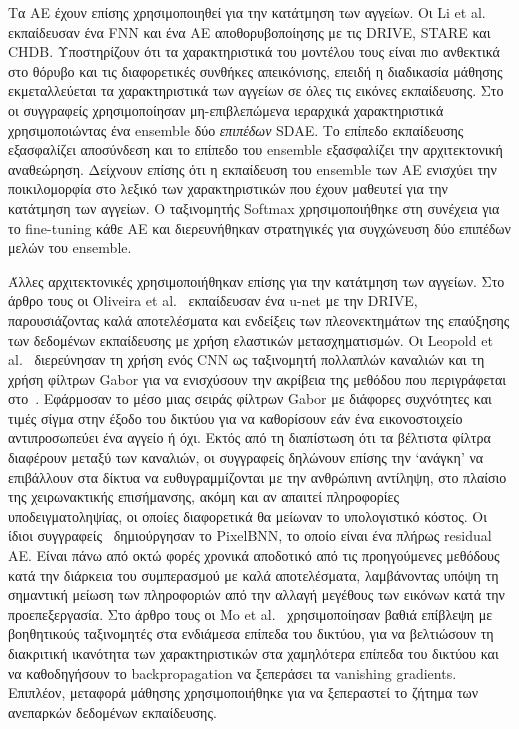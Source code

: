 Τα ΑΕ έχουν επίσης χρησιμοποιηθεί για την κατάτμηση των αγγείων.
Οι Li et al.~\cite{li2016cross} εκπαίδευσαν ένα FNN και ένα AE αποθορυβοποίησης με τις DRIVE, STARE και CHDB\@.
Υποστηρίζουν ότι τα χαρακτηριστικά του μοντέλου τους είναι πιο ανθεκτικά στο θόρυβο και τις διαφορετικές συνθήκες απεικόνισης, επειδή η διαδικασία μάθησης εκμεταλλεύεται τα χαρακτηριστικά των αγγείων σε όλες τις εικόνες εκπαίδευσης.
Στο~\cite{lahiri2016deep} οι συγγραφείς χρησιμοποίησαν μη-επιβλεπώμενα ιεραρχικά χαρακτηριστικά χρησιμοποιώντας ένα ensemble δύο \textit{επιπέδων} SDAE\@.
Το επίπεδο εκπαίδευσης εξασφαλίζει αποσύνδεση και το επίπεδο του ensemble εξασφαλίζει την αρχιτεκτονική αναθεώρηση.
Δείχνουν επίσης ότι η εκπαίδευση του ensemble των ΑΕ ενισχύει την ποικιλομορφία στο λεξικό των χαρακτηριστικών που έχουν μαθευτεί για την κατάτμηση των αγγείων.
Ο ταξινομητής Softmax χρησιμοποιήθηκε στη συνέχεια για το fine-tuning κάθε ΑΕ και διερευνήθηκαν στρατηγικές για συγχώνευση δύο επιπέδων μελών του ensemble.

Άλλες αρχιτεκτονικές χρησιμοποιήθηκαν επίσης για την κατάτμηση των αγγείων.
Στο άρθρο τους οι Oliveira et al.~\cite{oliveira2017augmenting} εκπαίδευσαν ένα u-net με την DRIVE, παρουσιάζοντας καλά αποτελέσματα και ενδείξεις των πλεονεκτημάτων της επαύξησης των δεδομένων εκπαίδευσης με χρήση ελαστικών μετασχηματισμών.
Οι Leopold et al.~\cite{leopold2017use} διερεύνησαν τη χρήση ενός CNN ως ταξινομητή πολλαπλών καναλιών και τη χρήση φίλτρων Gabor για να ενισχύσουν την ακρίβεια της μεθόδου που περιγράφεται στο~\cite{leopold2017segmentation}.
Εφάρμοσαν το μέσο μιας σειράς φίλτρων Gabor με διάφορες συχνότητες και τιμές σίγμα στην έξοδο του δικτύου για να καθορίσουν εάν ένα εικονοστοιχείο αντιπροσωπεύει ένα αγγείο ή όχι.
Εκτός από τη διαπίστωση ότι τα βέλτιστα φίλτρα διαφέρουν μεταξύ των καναλιών, οι συγγραφείς δηλώνουν επίσης την `ανάγκη' να επιβάλλουν στα δίκτυα να ευθυγραμμίζονται με την ανθρώπινη αντίληψη, στο πλαίσιο της χειρωνακτικής επισήμανσης, ακόμη και αν απαιτεί πληροφορίες υποδειγματοληψίας, οι οποίες διαφορετικά θα μείωναν το υπολογιστικό κόστος.
Οι ίδιοι συγγραφείς~\cite{leopold2017pixelbnn} δημιούργησαν το PixelBNN, το οποίο είναι ένα πλήρως residual AE\@.
Είναι πάνω από οκτώ φορές χρονικά αποδοτικό από τις προηγούμενες μεθόδους κατά την διάρκεια του συμπερασμού με καλά αποτελέσματα, λαμβάνοντας υπόψη τη σημαντική μείωση των πληροφοριών από την αλλαγή μεγέθους των εικόνων κατά την προεπεξεργασία.
Στο άρθρο τους οι Mo et al.~\cite{mo2017multi} χρησιμοποίησαν βαθιά επίβλεψη με βοηθητικούς ταξινομητές στα ενδιάμεσα επίπεδα του δικτύου, για να βελτιώσουν τη διακριτική ικανότητα των χαρακτηριστικών στα χαμηλότερα επίπεδα του δικτύου και να καθοδηγήσουν το backpropagation να ξεπεράσει τα vanishing gradients.
Επιπλέον, μεταφορά μάθησης χρησιμοποιήθηκε για να ξεπεραστεί το ζήτημα των ανεπαρκών δεδομένων εκπαίδευσης.

